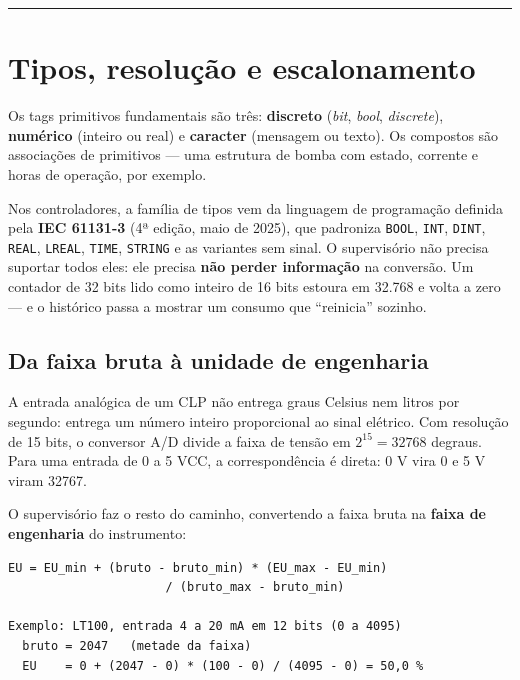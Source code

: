\begin{center}\rule{0.5\linewidth}{0.5pt}\end{center}

\section{Tipos, resolução e escalonamento}\label{tipos-resoluuxe7uxe3o-e-escalonamento}

Os tags primitivos fundamentais são três: \textbf{discreto} (\emph{bit}, \emph{bool}, \emph{discrete}), \textbf{numérico}
(inteiro ou real) e \textbf{caracter} (mensagem ou texto). Os compostos são associações de primitivos ---
uma estrutura de bomba com estado, corrente e horas de operação, por exemplo.

Nos controladores, a família de tipos vem da linguagem de programação definida pela \textbf{IEC 61131-3}
(4ª edição, maio de 2025), que padroniza \passthrough{\lstinline!BOOL!}, \passthrough{\lstinline!INT!}, \passthrough{\lstinline!DINT!}, \passthrough{\lstinline!REAL!}, \passthrough{\lstinline!LREAL!}, \passthrough{\lstinline!TIME!}, \passthrough{\lstinline!STRING!} e
as variantes sem sinal. O supervisório não precisa suportar todos eles: ele precisa \textbf{não perder
informação} na conversão. Um contador de 32 bits lido como inteiro de 16 bits estoura em 32.768 e
volta a zero --- e o histórico passa a mostrar um consumo que ``reinicia'' sozinho.

\subsection{Da faixa bruta à unidade de engenharia}\label{da-faixa-bruta-uxe0-unidade-de-engenharia}

A entrada analógica de um CLP não entrega graus Celsius nem litros por segundo: entrega um número
inteiro proporcional ao sinal elétrico. Com resolução de 15 bits, o conversor A/D divide a faixa de
tensão em \(2^{15} = 32768\) degraus. Para uma entrada de 0 a 5 VCC, a correspondência é direta:
0 V vira 0 e 5 V viram 32767.

O supervisório faz o resto do caminho, convertendo a faixa bruta na \textbf{faixa de engenharia} do
instrumento:

\begin{lstlisting}
EU = EU_min + (bruto - bruto_min) * (EU_max - EU_min)
                      / (bruto_max - bruto_min)

Exemplo: LT100, entrada 4 a 20 mA em 12 bits (0 a 4095)
  bruto = 2047   (metade da faixa)
  EU    = 0 + (2047 - 0) * (100 - 0) / (4095 - 0) = 50,0 %
\end{lstlisting}

